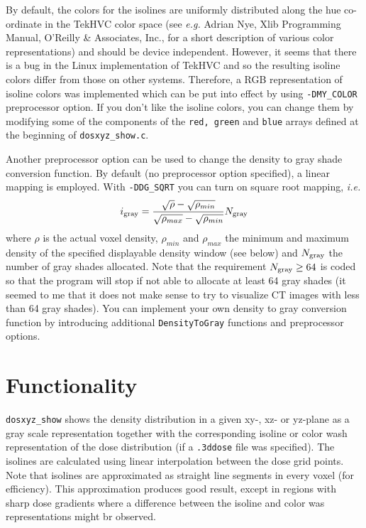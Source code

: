 \documentclass[12pt]{article}
\begin{document}
By default, the colors for the isolines are uniformly distributed
along the hue co-ordinate in the TekHVC color space (see
{\em e.g.} Adrian Nye, Xlib Programming Manual, O'Reilly \& Associates, Inc.,
for a short description of various color representations) and
should be device independent. However, it seems that there
is a bug in the Linux implementation of TekHVC and so
the resulting isoline colors differ from those on other systems.
Therefore, a RGB representation of isoline colors was
implemented which can be put into effect by
using {\tt -DMY\_COLOR} preprocessor option. If you
don't like the isoline colors, you can change them by
modifying some of the components of the {\tt red, green} and {\tt blue}
arrays defined at the beginning of {\tt dosxyz\_show.c}.

Another preprocessor option can be used to change the
density to gray shade conversion function. By default
(no preprocessor option specified), a linear mapping
is employed. With {\tt -DDG\_SQRT} you can turn on
square root mapping, {\em i.e.}
\begin{displaymath}
i_{\rm gray} = {\sqrt{\rho} - \sqrt{\rho_{min}} \over
\sqrt{\rho_{max}} - \sqrt{\rho_{min}}} N_{\rm gray}
\end{displaymath}
where $\rho$ is the actual voxel density, $\rho_{min}$ and
$\rho_{max}$ the minimum and maximum density of the specified
displayable density window (see below) and $N_{\rm gray}$ the
number of gray shades allocated. Note that the
requirement $N_{\rm gray} \ge 64$ is coded so that
the program will stop if not able to allocate at least
64 gray shades (it seemed to me that it does not make sense
to try to visualize CT images with less than 64 gray shades).
You can implement your own density to gray conversion
function by introducing additional {\tt DensityToGray}
functions and preprocessor options.

\section{\sffamily Functionality}

{\tt dosxyz\_show} shows the density distribution
in a given xy-, xz- or yz-plane as a gray scale representation
together with the corresponding isoline or
color wash representation of the dose distribution
(if a {\tt .3ddose} file was specified). The isolines are
calculated using linear interpolation between the dose grid points.
Note that isolines are approximated as straight line segments in
every voxel (for efficiency). This approximation
produces good result, except in regions with sharp dose gradients
where a difference between the isoline and color was representations
might br observed.
\end{document}
